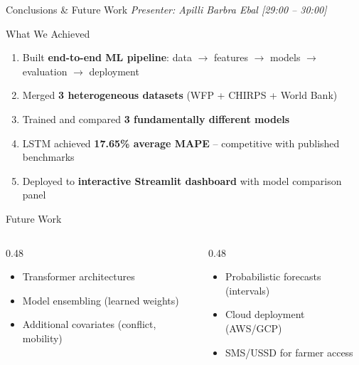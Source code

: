 \documentclass[aspectratio=169,11pt]{beamer}
\begin{document}
\begin{frame}{Conclusions \& Future Work}
\textit{\small Presenter: Apilli Barbra Ebal \hfill [29:00 -- 30:00]}
\begin{block}{What We Achieved}
\begin{enumerate}
    \item Built \textbf{end-to-end ML pipeline}: data $\rightarrow$ features $\rightarrow$ models $\rightarrow$ evaluation $\rightarrow$ deployment
    \item Merged \textbf{3 heterogeneous datasets} (WFP + CHIRPS + World Bank)
    \item Trained and compared \textbf{3 fundamentally different models}
    \item LSTM achieved \textbf{17.65\% average MAPE} -- competitive with published benchmarks
    \item Deployed to \textbf{interactive Streamlit dashboard} with model comparison panel
\end{enumerate}
\end{block}

\begin{block}{Future Work}
\begin{columns}
\begin{column}{0.48\textwidth}
\begin{itemize}
    \item Transformer architectures
    \item Model ensembling (learned weights)
    \item Additional covariates (conflict, mobility)
\end{itemize}
\end{column}
\begin{column}{0.48\textwidth}
\begin{itemize}
    \item Probabilistic forecasts (intervals)
    \item Cloud deployment (AWS/GCP)
    \item SMS/USSD for farmer access
\end{itemize}
\end{column}
\end{columns}
\end{block}
\end{frame}
\end{document}

